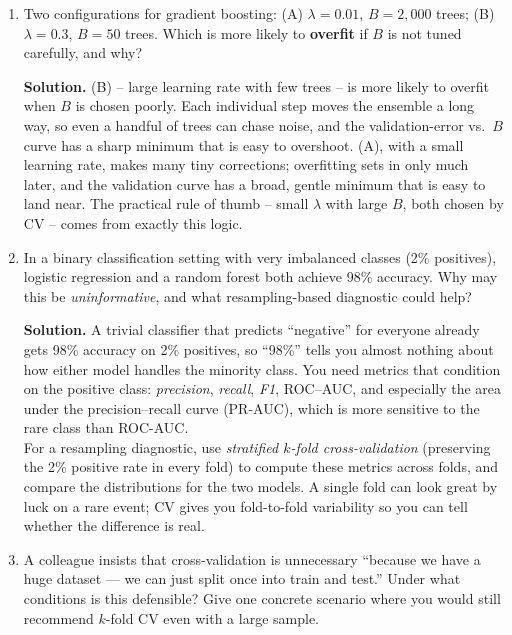\documentclass[11pt]{article}
\newcommand{\solution}[1]{%
  \par\medskip\noindent\textbf{Solution.} #1\par\medskip
}
\begin{document}
\begin{enumerate}[leftmargin=*]
\item Two configurations for gradient boosting: (A) $\lambda = 0.01$, $B = 2{,}000$ trees; (B) $\lambda = 0.3$, $B = 50$ trees. Which is more likely to \textbf{overfit} if $B$ is not tuned carefully, and why?

\solution{(B) -- large learning rate with few trees -- is more likely to overfit when $B$ is chosen poorly. Each individual step moves the ensemble a long way, so even a handful of trees can chase noise, and the validation-error vs.~$B$ curve has a sharp minimum that is easy to overshoot. (A), with a small learning rate, makes many tiny corrections; overfitting sets in only much later, and the validation curve has a broad, gentle minimum that is easy to land near. The practical rule of thumb -- small $\lambda$ with large $B$, both chosen by CV -- comes from exactly this logic.}

\item In a binary classification setting with very imbalanced classes (2\% positives), logistic regression and a random forest both achieve 98\% accuracy. Why may this be \emph{uninformative}, and what resampling-based diagnostic could help?

\solution{A trivial classifier that predicts ``negative'' for everyone already gets 98\% accuracy on 2\% positives, so ``98\%'' tells you almost nothing about how either model handles the minority class. You need metrics that condition on the positive class: \emph{precision}, \emph{recall}, \emph{F1}, ROC--AUC, and especially the area under the precision--recall curve (PR-AUC), which is more sensitive to the rare class than ROC-AUC.\\
For a resampling diagnostic, use \emph{stratified $k$-fold cross-validation} (preserving the 2\% positive rate in every fold) to compute these metrics across folds, and compare the distributions for the two models. A single fold can look great by luck on a rare event; CV gives you fold-to-fold variability so you can tell whether the difference is real.}

\item A colleague insists that cross-validation is unnecessary ``because we have a huge dataset --- we can just split once into train and test.'' Under what conditions is this defensible? Give one concrete scenario where you would still recommend $k$-fold CV even with a large sample.


\end{enumerate}
\end{document}
